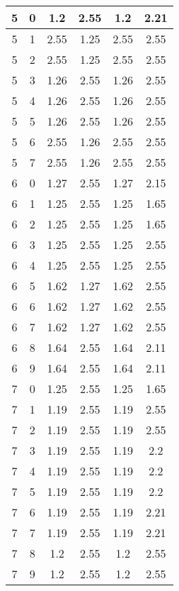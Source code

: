 \begin{longtable}{|c|c||c||c||c|c|}
	5 & 0 & 1.2 & 2.55 & 1.2 & 2.21 \\ \hline
	5 & 1 & 2.55 & 1.25 & 2.55 & 2.55 \\ \hline
	5 & 2 & 2.55 & 1.25 & 2.55 & 2.55 \\ \hline
	5 & 3 & 1.26 & 2.55 & 1.26 & 2.55 \\ \hline
	5 & 4 & 1.26 & 2.55 & 1.26 & 2.55 \\ \hline
	5 & 5 & 1.26 & 2.55 & 1.26 & 2.55 \\ \hline
	5 & 6 & 2.55 & 1.26 & 2.55 & 2.55 \\ \hline
	5 & 7 & 2.55 & 1.26 & 2.55 & 2.55 \\ \hline
	6 & 0 & 1.27 & 2.55 & 1.27 & 2.15 \\ \hline
	6 & 1 & 1.25 & 2.55 & 1.25 & 1.65 \\ \hline
	6 & 2 & 1.25 & 2.55 & 1.25 & 1.65 \\ \hline
	6 & 3 & 1.25 & 2.55 & 1.25 & 2.55 \\ \hline
	6 & 4 & 1.25 & 2.55 & 1.25 & 2.55 \\ \hline
	6 & 5 & 1.62 & 1.27 & 1.62 & 2.55 \\ \hline
	6 & 6 & 1.62 & 1.27 & 1.62 & 2.55 \\ \hline
	6 & 7 & 1.62 & 1.27 & 1.62 & 2.55 \\ \hline
	6 & 8 & 1.64 & 2.55 & 1.64 & 2.11 \\ \hline
	6 & 9 & 1.64 & 2.55 & 1.64 & 2.11 \\ \hline
	7 & 0 & 1.25 & 2.55 & 1.25 & 1.65 \\ \hline
	7 & 1 & 1.19 & 2.55 & 1.19 & 2.55 \\ \hline
	7 & 2 & 1.19 & 2.55 & 1.19 & 2.55 \\ \hline
	7 & 3 & 1.19 & 2.55 & 1.19 & 2.2 \\ \hline
	7 & 4 & 1.19 & 2.55 & 1.19 & 2.2 \\ \hline
	7 & 5 & 1.19 & 2.55 & 1.19 & 2.2 \\ \hline
	7 & 6 & 1.19 & 2.55 & 1.19 & 2.21 \\ \hline
	7 & 7 & 1.19 & 2.55 & 1.19 & 2.21 \\ \hline
	7 & 8 & 1.2 & 2.55 & 1.2 & 2.55 \\ \hline
	7 & 9 & 1.2 & 2.55 & 1.2 & 2.55 \\ \hline
\end{longtable}

